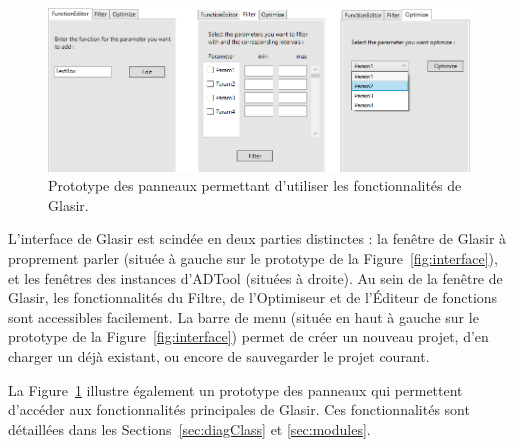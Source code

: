     \begin{figure}[h!]
        \centering
        \includegraphics[height=0.42\textwidth]{figure/ongletsGlasir.png}
        \caption{Prototype des panneaux permettant d'utiliser les fonctionnalités de Glasir.}
        \label{fig:panneaux}
    \end{figure}
    
L'interface de Glasir est scindée en deux parties distinctes : la fenêtre de Glasir à proprement parler (située à gauche sur le prototype de la {\sc Figure}~\ref{fig:interface}), et les fenêtres des instances d'ADTool (situées à droite). Au sein de la fenêtre de Glasir, les fonctionnalités du Filtre, de l'Optimiseur et de l'Éditeur de fonctions sont accessibles facilement. La barre de menu (située en haut à gauche sur le prototype de la {\sc Figure}~\ref{fig:interface}) permet de créer un nouveau projet, d'en charger un déjà existant, ou encore de sauvegarder le projet courant.
    
    La {\sc Figure}~\ref{fig:panneaux} illustre également un prototype des panneaux qui permettent d'accéder aux fonctionnalités principales de Glasir. Ces fonctionnalités sont détaillées dans les {\sc Sections}~\ref{sec:diagClass} et \ref{sec:modules}.  